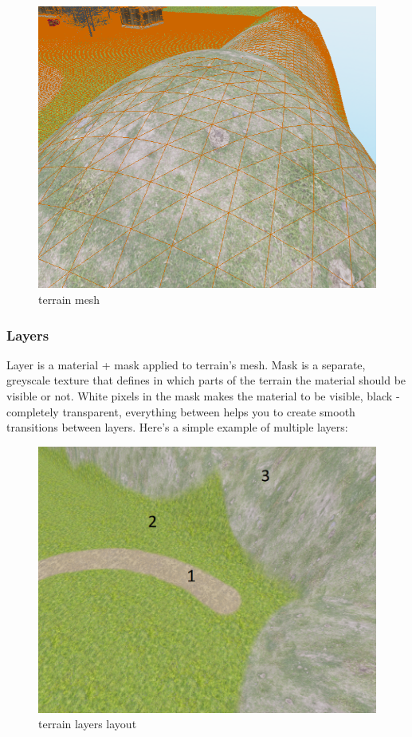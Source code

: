 \documentclass[
]{book}
\theoremstyle{definition}
\theoremstyle{definition}
\theoremstyle{definition}
\theoremstyle{definition}
\theoremstyle{remark}
\begin{document}
\begin{figure}
\centering
\includegraphics{images/scene_terrain_mesh.png}
\caption{terrain mesh}
\end{figure}

\subsubsection{Layers}\label{layers}

Layer is a material + mask applied to terrain's mesh. Mask is a separate, greyscale texture that defines in which parts of the terrain the material should be visible or not. White pixels in the mask makes the material to be visible, black - completely transparent, everything between helps you to create smooth transitions between layers. Here's a simple example of multiple layers:

\begin{figure}
\centering
\includegraphics{images/scene_terrain_layers_layout.png}
\caption{terrain layers layout}
\end{figure}
\end{document}
